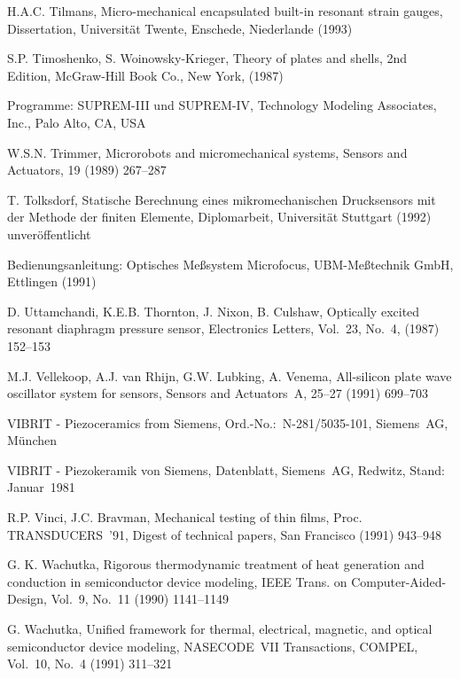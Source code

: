 \begin{thebibliography}{xxx}
 H.A.C. Tilmans, Micro-mechanical encapsulated built-in resonant strain
 gauges, Dissertation, Universität Twente, Enschede, Niederlande (1993)

 S.P. Timoshenko, S. Woinowsky-Krieger, Theory of plates and shells,
 2nd Edition, McGraw-Hill Book Co., New York, (1987)

 Programme: SUPREM-III und SUPREM-IV, Technology Modeling Associates, Inc.,
 Palo Alto, CA, USA

 W.S.N. Trimmer, Microrobots and micromechanical systems, Sensors and
 Actuators, 19 (1989) 267--287

 T. Tolksdorf, Statische Berechnung eines mikromechanischen Drucksensors
 mit der Methode der finiten Elemente, Diplomarbeit, Universität Stuttgart
 (1992) unveröffentlicht

 Bedienungsanleitung: Optisches Meßsystem Microfocus, UBM-Meßtechnik GmbH,
 Ettlingen (1991)

 D. Uttamchandi, K.E.B. Thornton, J. Nixon, B. Culshaw, Optically excited
 resonant diaphragm pressure sensor, Electronics Letters, Vol.~23, No.~4,
 (1987) 152--153

 M.J. Vellekoop, A.J. van Rhijn, G.W. Lubking, A. Venema, All-silicon plate
 wave oscillator system for sensors, Sensors and Actuators~A, 25--27 (1991) 699--703

 VIBRIT - Piezoceramics from Siemens, Ord.-No.:~N-281/5035-101, Siemens~AG,
 München

 VIBRIT - Piezokeramik von Siemens, Datenblatt, Siemens~AG, Redwitz,
 Stand: Januar~1981

 R.P. Vinci, J.C. Bravman, Mechanical testing of thin films, Proc.
 TRANSDUCERS~'91, Digest of technical papers, San Francisco (1991) 943--948

 G. K. Wachutka, Rigorous thermodynamic treatment of heat generation and
 conduction in semiconductor device modeling, IEEE Trans. on
 Computer-Aided-Design, Vol.~9, No.~11 (1990) 1141--1149

 G. Wachutka, Unified framework for thermal, electrical, magnetic, and
 optical semiconductor device modeling, NASECODE~VII Transactions, COMPEL,
 Vol.~10, No.~4 (1991) 311--321


\end{thebibliography}
